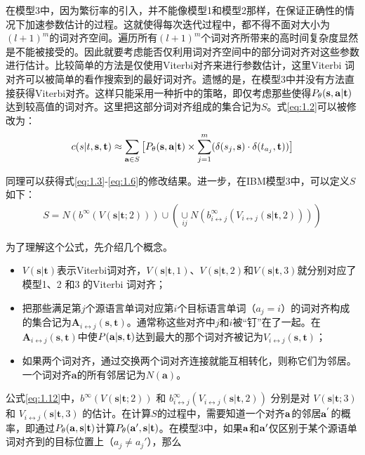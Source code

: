 \begin{appendices}
\parinterval 在模型3中，因为繁衍率的引入，并不能像模型1和模型2那样，在保证正确性的情况下加速参数估计的过程。这就使得每次迭代过程中，都不得不面对大小为$(l+1)^m$的词对齐空间。遍历所有$(l+1)^m$个词对齐所带来的高时间复杂度显然是不能被接受的。因此就要考虑能否仅利用词对齐空间中的部分词对齐对这些参数进行估计。比较简单的方法是仅使用Viterbi对齐来进行参数估计，这里Viterbi 词对齐可以被简单的看作搜索到的最好词对齐。遗憾的是，在模型3中并没有方法直接获得Viterbi对齐。这样只能采用一种折中的策略，即仅考虑那些使得${P}_{\theta}(\mathbf{s},\mathbf{a}|\mathbf{t})$ 达到较高值的词对齐。这里把这部分词对齐组成的集合记为$S$。式\ref{eq:1.2}可以被修改为：
\begin{eqnarray}
c(s|t,\mathbf{s},\mathbf{t}) \approx \sum_{\mathbf{a} \in S}\big[{P}_{\theta}(\mathbf{s},\mathbf{a}|\mathbf{t}) \times \sum_{j=1}^{m}(\delta(s_j,\mathbf{s}) \cdot \delta(t_{a_{j}},\mathbf{t})) \big]
\label{eq:1.11}
\end{eqnarray}

\parinterval 同理可以获得式\ref{eq:1.3}-\ref{eq:1.6}的修改结果。进一步，在IBM模型3中，可以定义$S$如下：
\begin{eqnarray}
S = N(b^{\infty}(V(\mathbf{s}|\mathbf{t};2))) \cup (\mathop{\cup}\limits_{ij} N(b_{i \leftrightarrow j}^{\infty}(V_{i \leftrightarrow j}(\mathbf{s}|\mathbf{t},2))))
\label{eq:1.12}
\end{eqnarray}

\parinterval 为了理解这个公式，先介绍几个概念。
\begin{itemize}
\item $V(\mathbf{s}|\mathbf{t})$表示Viterbi词对齐，$V(\mathbf{s}|\mathbf{t},1)$、$V(\mathbf{s}|\mathbf{t},2)$和$V(\mathbf{s}|\mathbf{t},3)$就分别对应了模型1、2 和3 的Viterbi 词对齐；
\item 把那些满足第$j$个源语言单词对应第$i$个目标语言单词（$a_j=i$）的词对齐构成的集合记为$\mathbf{A}_{i \leftrightarrow j}(\mathbf{s},\mathbf{t})$。通常称这些对齐中$j$和$i$被``钉''在了一起。在$\mathbf{A}_{i \leftrightarrow j}(\mathbf{s},\mathbf{t})$中使${P}(\mathbf{a}|\mathbf{s},\mathbf{t})$达到最大的那个词对齐被记为$V_{i \leftrightarrow j}(\mathbf{s},\mathbf{t})$；
\item 如果两个词对齐，通过交换两个词对齐连接就能互相转化，则称它们为邻居。一个词对齐$\mathbf{a}$的所有邻居记为$N(\mathbf{a})$。
\end{itemize}

\vspace{0.5em}
\parinterval 公式\ref{eq:1.12}中，$b^{\infty}(V(\mathbf{s}|\mathbf{t};2))$ 和 $b_{i \leftrightarrow j}^{\infty}(V_{i \leftrightarrow j}(\mathbf{s}|\mathbf{t},2))$ 分别是对 $V(\mathbf{s}|\mathbf{t};3)$ 和 $V_{i \leftrightarrow j}(\mathbf{s}|\mathbf{t},3)$ 的估计。在计算$S$的过程中，需要知道一个对齐$\bf{a}$的邻居$\bf{a}^{'}$的概率，即通过${P}_{\theta}(\mathbf{a},\mathbf{s}|\mathbf{t})$计算${P}_{\theta}(\mathbf{a}',\mathbf{s}|\mathbf{t})$。在模型3中，如果$\bf{a}$和$\bf{a}'$仅区别于某个源语单词对齐到的目标位置上（$a_j \neq a_{j}'$），那么


\end{appendices}

